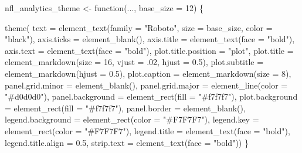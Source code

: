 \documentclass[
  letterpaper,
]{krantz}
\newenvironment{Shaded}{\begin{snugshade}}{\end{snugshade}}
\newcommand{\AttributeTok}[1]{\textcolor[rgb]{0.40,0.45,0.13}{#1}}
\newcommand{\ControlFlowTok}[1]{\textcolor[rgb]{0.00,0.23,0.31}{#1}}
\newcommand{\DecValTok}[1]{\textcolor[rgb]{0.68,0.00,0.00}{#1}}
\newcommand{\FloatTok}[1]{\textcolor[rgb]{0.68,0.00,0.00}{#1}}
\newcommand{\FunctionTok}[1]{\textcolor[rgb]{0.28,0.35,0.67}{#1}}
\newcommand{\NormalTok}[1]{\textcolor[rgb]{0.00,0.23,0.31}{#1}}
\newcommand{\OtherTok}[1]{\textcolor[rgb]{0.00,0.23,0.31}{#1}}
\newcommand{\StringTok}[1]{\textcolor[rgb]{0.13,0.47,0.30}{#1}}
\begin{document}
\begin{Shaded}
\begin{Highlighting}[]
\NormalTok{nfl\_analytics\_theme }\OtherTok{\textless{}{-}} \ControlFlowTok{function}\NormalTok{(..., }\AttributeTok{base\_size =} \DecValTok{12}\NormalTok{) \{}
  
  \FunctionTok{theme}\NormalTok{(}
    \AttributeTok{text =} \FunctionTok{element\_text}\NormalTok{(}\AttributeTok{family =} \StringTok{"Roboto"}\NormalTok{,}
                        \AttributeTok{size =}\NormalTok{ base\_size,}
                        \AttributeTok{color =} \StringTok{"black"}\NormalTok{),}
    \AttributeTok{axis.ticks =} \FunctionTok{element\_blank}\NormalTok{(),}
    \AttributeTok{axis.title =} \FunctionTok{element\_text}\NormalTok{(}\AttributeTok{face =} \StringTok{"bold"}\NormalTok{),}
    \AttributeTok{axis.text =} \FunctionTok{element\_text}\NormalTok{(}\AttributeTok{face =} \StringTok{"bold"}\NormalTok{),}
    \AttributeTok{plot.title.position =} \StringTok{"plot"}\NormalTok{,}
    \AttributeTok{plot.title =} \FunctionTok{element\_markdown}\NormalTok{(}\AttributeTok{size =} \DecValTok{16}\NormalTok{,}
                                  \AttributeTok{vjust =}\NormalTok{ .}\DecValTok{02}\NormalTok{,}
                                  \AttributeTok{hjust =} \FloatTok{0.5}\NormalTok{),}
    \AttributeTok{plot.subtitle =} \FunctionTok{element\_markdown}\NormalTok{(}\AttributeTok{hjust =} \FloatTok{0.5}\NormalTok{),}
    \AttributeTok{plot.caption =} \FunctionTok{element\_markdown}\NormalTok{(}\AttributeTok{size =} \DecValTok{8}\NormalTok{),}
    \AttributeTok{panel.grid.minor =} \FunctionTok{element\_blank}\NormalTok{(),}
    \AttributeTok{panel.grid.major =}  \FunctionTok{element\_line}\NormalTok{(}\AttributeTok{color =} \StringTok{"\#d0d0d0"}\NormalTok{),}
    \AttributeTok{panel.background =} \FunctionTok{element\_rect}\NormalTok{(}\AttributeTok{fill =} \StringTok{"\#f7f7f7"}\NormalTok{),}
    \AttributeTok{plot.background =} \FunctionTok{element\_rect}\NormalTok{(}\AttributeTok{fill =} \StringTok{"\#f7f7f7"}\NormalTok{),}
    \AttributeTok{panel.border =} \FunctionTok{element\_blank}\NormalTok{(),}
    \AttributeTok{legend.background =} \FunctionTok{element\_rect}\NormalTok{(}\AttributeTok{color =} \StringTok{"\#F7F7F7"}\NormalTok{),}
    \AttributeTok{legend.key =} \FunctionTok{element\_rect}\NormalTok{(}\AttributeTok{color =} \StringTok{"\#F7F7F7"}\NormalTok{),}
    \AttributeTok{legend.title =} \FunctionTok{element\_text}\NormalTok{(}\AttributeTok{face =} \StringTok{"bold"}\NormalTok{),}
    \AttributeTok{legend.title.align =} \FloatTok{0.5}\NormalTok{,}
    \AttributeTok{strip.text =} \FunctionTok{element\_text}\NormalTok{(}\AttributeTok{face =} \StringTok{"bold"}\NormalTok{))}
\NormalTok{\}}
\end{Highlighting}
\end{Shaded}
\end{document}
